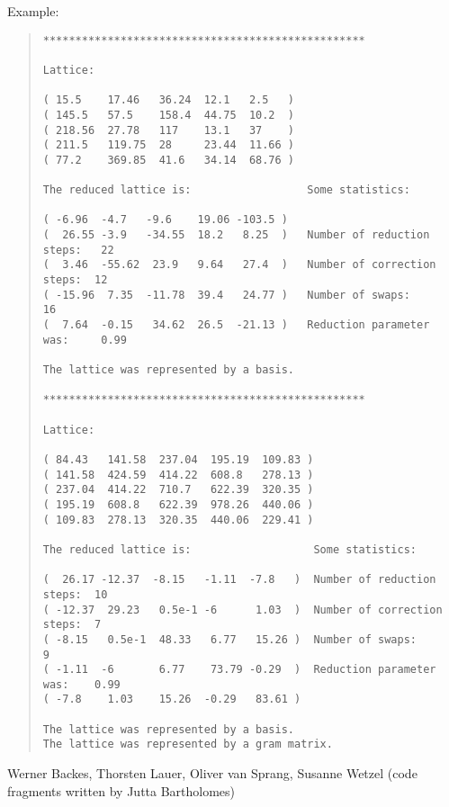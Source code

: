 Example:
\begin{quote}
\begin{verbatim}
**************************************************

Lattice:

( 15.5    17.46   36.24  12.1   2.5   )
( 145.5   57.5    158.4  44.75  10.2  )
( 218.56  27.78   117    13.1   37    )
( 211.5   119.75  28     23.44  11.66 )
( 77.2    369.85  41.6   34.14  68.76 )

The reduced lattice is:                  Some statistics:

( -6.96  -4.7   -9.6    19.06 -103.5 )
(  26.55 -3.9   -34.55  18.2   8.25  )   Number of reduction steps:   22
(  3.46  -55.62  23.9   9.64   27.4  )   Number of correction steps:  12
( -15.96  7.35  -11.78  39.4   24.77 )   Number of swaps:             16
(  7.64  -0.15   34.62  26.5  -21.13 )   Reduction parameter was:     0.99

The lattice was represented by a basis.

**************************************************

Lattice:

( 84.43   141.58  237.04  195.19  109.83 )
( 141.58  424.59  414.22  608.8   278.13 )
( 237.04  414.22  710.7   622.39  320.35 )
( 195.19  608.8   622.39  978.26  440.06 )
( 109.83  278.13  320.35  440.06  229.41 )

The reduced lattice is:                   Some statistics:

(  26.17 -12.37  -8.15   -1.11  -7.8   )  Number of reduction steps:  10
( -12.37  29.23   0.5e-1 -6      1.03  )  Number of correction steps:  7
( -8.15   0.5e-1  48.33   6.77   15.26 )  Number of swaps:             9
( -1.11  -6       6.77    73.79 -0.29  )  Reduction parameter was:    0.99
( -7.8    1.03    15.26  -0.29   83.61 )

The lattice was represented by a basis.
The lattice was represented by a gram matrix.
\end{verbatim}
\end{quote}



\AUTHOR

Werner Backes, Thorsten Lauer, Oliver van Sprang, Susanne Wetzel (code fragments written by
Jutta Bartholomes)

